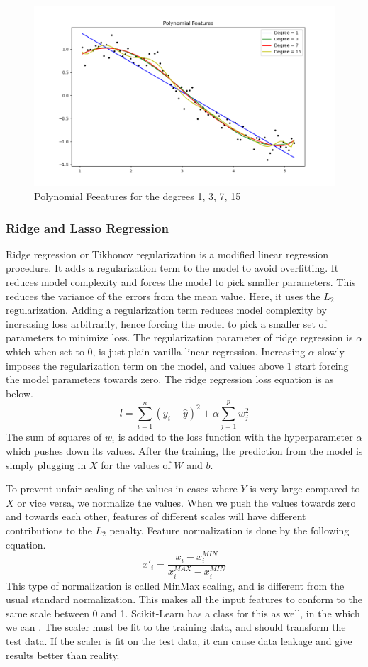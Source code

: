\documentclass{article}
\newcommand{\code}[1]{{\fontfamily{zi4} \selectfont{#1}}}
\begin{document}
\begin{figure}[H]
\includegraphics[width=\linewidth]{Images/poly_reg.png}
\centering
\caption{Polynomial Feeatures for the degrees 1, 3, 7, 15}
\end{figure}

\subsubsection{Ridge and Lasso Regression}
Ridge regression or Tikhonov regularization is a modified linear regression procedure. It adds a regularization term to the model to avoid overfitting. It reduces model complexity and forces the model to pick smaller parameters. This reduces the variance of the errors from the mean value. Here, it uses the $L_2$ regularization. Adding a regularization term reduces model complexity by increasing loss arbitrarily, hence forcing the model to pick a smaller set of parameters to minimize loss. The regularization parameter of ridge regression is $\alpha$ which when set to 0, is just plain vanilla linear regression. Increasing $\alpha$ slowly imposes the regularization term on the model, and values above 1 start forcing the model parameters towards zero. The ridge regression loss equation is as below.
$$l = \sum_{i=1}^n (y_i - \hat{y})^2 + \alpha \sum_{j=1}^p w_j ^2$$
The sum of squares of $w_i$ is added to the loss function with the hyperparameter $\alpha$ which pushes down its values. After the training, the prediction from the model is simply plugging in $X$ for the values of $W$ and $b$.

To prevent unfair scaling of the values in cases where $Y$ is very large compared to $X$ or vice versa, we normalize the values. When we push the values towards zero and towards each other, features of different scales will have different contributions to the $L_2$ penalty. Feature normalization is done by the following equation.
$$x'_i = \frac{x_i - x^{MIN}_i}{x^{MAX}_i - x^{MIN}_i}$$
This type of normalization is called MinMax scaling, and is different from the usual standard normalization. This makes all the input features to conform to the same scale between 0 and 1. Scikit-Learn has a class for this as well, in the \code{sklearn.preprocessing.MinMaxScaler} which we can \code{model.fit\_transform()}. The scaler must be fit to the training data, and should transform the test data. If the scaler is fit on the test data, it can cause data leakage and give results better than reality. 
\end{document}

